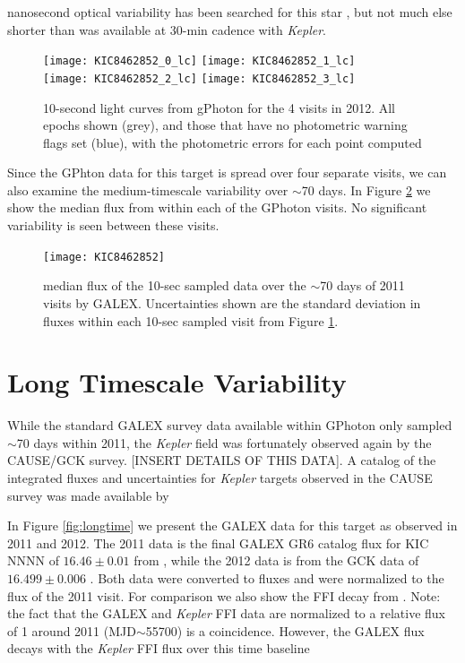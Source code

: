 \documentclass[twocolumn]{aastex6}
\newcommand{\Kepler}{\textsl{Kepler}\xspace}
\begin{document}
nanosecond optical variability has been searched for this star \citep{abeysekara2016}, but not much else shorter than was available at 30-min cadence with \Kepler.


\begin{figure}[]
\centering
\texttt{[image: KIC8462852\_0\_lc]}
\texttt{[image: KIC8462852\_1\_lc]}\\
\texttt{[image: KIC8462852\_2\_lc]}
\texttt{[image: KIC8462852\_3\_lc]}
\caption{
10-second light curves from gPhoton for the 4 visits in 2012. All epochs shown (grey), and those that have no photometric warning flags set (blue), with the photometric errors for each point computed}
\label{fig:shorttime}
\end{figure}


Since the GPhton data for this target is spread over four separate visits, we can also examine the medium-timescale variability over $\sim$70 days. In Figure \ref{fig:medtime} we show the median flux from within each of the GPhoton visits. No significant variability is seen between these visits.

\begin{figure}[]
\centering
\texttt{[image: KIC8462852]}
\caption{median flux of the 10-sec sampled data over the $\sim$70 days of 2011 visits by GALEX. Uncertainties shown are the standard deviation in fluxes within each 10-sec sampled visit from Figure \ref{fig:shorttime}.
}
\label{fig:medtime}
\end{figure}





\section{Long Timescale Variability}

While the standard GALEX survey data available within GPhoton only sampled $\sim$70 days within 2011, the \Kepler field was fortunately observed again by the CAUSE/GCK survey. [INSERT DETAILS OF THIS DATA]. A catalog of the integrated fluxes and uncertainties for \Kepler targets observed in the CAUSE survey was made available by \citet{olmedo2015}


In Figure \ref{fig:longtime} we present the GALEX data for this target as observed in 2011 and 2012. The 2011 data is the final GALEX GR6 catalog flux for KIC NNNN of $16.46 \pm 0.01$ from \citet{bianchi2014}, while the 2012 data is from the GCK data of $16.499\pm0.006$ \citet{olmedo2015}. Both data were converted to fluxes and were normalized to the flux of the 2011 visit. For comparison we also show the FFI decay from \citet{montet2016}. Note: the fact that the GALEX and \Kepler FFI data are normalized to a relative flux of 1 around 2011 (MJD$\sim$55700) is a coincidence. However, the GALEX flux decays with the \Kepler FFI flux over this time baseline
\end{document}
